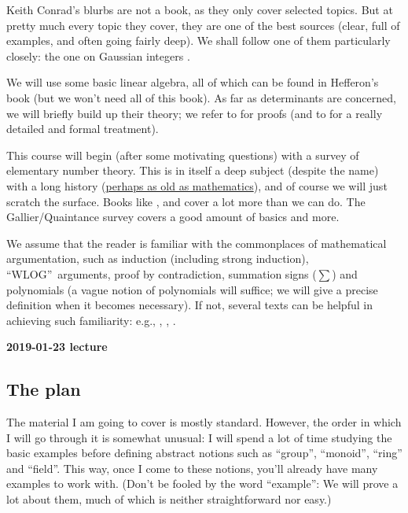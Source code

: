 \documentclass[numbers=enddot,12pt,final,onecolumn,notitlepage]{scrartcl}%
\numberwithin{exer}{subsection}
\theoremstyle{definition}
\let\sumnonlimits\sum
\renewcommand{\sum}{\sumnonlimits\limits}
\begin{document}
Keith Conrad's blurbs \cite{Conrad*} are not a book, as they only cover
selected topics. But at pretty much every topic they cover, they are one of
the best sources (clear, full of examples, and often going fairly deep). We
shall follow one of them particularly closely: the one on Gaussian integers
\cite{Conrad-Gauss}.

We will use some basic linear algebra, all of which can be found in Hefferon's
book \cite{Hefferon} (but we won't need all of this book). As far as
determinants are concerned, we will briefly build up their theory; we refer to
\cite[Section 12 \& Appendix B]{Strickland} for proofs (and to \cite[Chapter
6]{detnotes} for a really detailed and formal treatment).

This course will begin (after some motivating questions) with a survey of
elementary number theory. This is in itself a deep subject (despite the name)
with a long history (\href{https://en.wikipedia.org/wiki/Plimpton_322}{perhaps
as old as mathematics}), and of course we will just scratch the surface. Books
like \cite{NiZuMo91}, \cite{Burton} and \cite{Uspensky-Heaslet} cover a lot
more than we can do. The Gallier/Quaintance survey \cite{Gallier-RSA} covers a
good amount of basics and more.

We assume that the reader is familiar with the commonplaces of mathematical
argumentation, such as induction (including strong induction),
\textquotedblleft WLOG\textquotedblright\ arguments, proof by contradiction,
summation signs ($\sum$) and polynomials (a vague notion of polynomials will
suffice; we will give a precise definition when it becomes necessary). If not,
several texts can be helpful in achieving such familiarity: e.g.,
\cite[particularly Chapters 1--5]{LeLeMe}, \cite{Hammack}, \cite{Day}.

\begin{center}
\textbf{2019-01-23 lecture}
\end{center}

\subsection{The plan}

The material I am going to cover is mostly standard. However, the order in
which I will go through it is somewhat unusual: I will spend a lot of time
studying the basic examples before defining abstract notions such as
``group'', ``monoid'', ``ring'' and ``field''. This way, once I come to these
notions, you'll already have many examples to work with. (Don't be fooled by
the word ``example'': We will prove a lot about them, much of which is neither
straightforward nor easy.)
\end{document}
